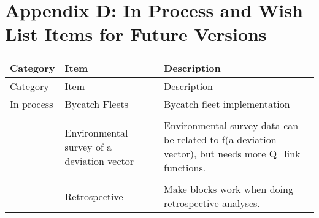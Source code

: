 \section{Appendix D: In Process and Wish List Items for Future Versions}

\begin{center}
	\begin{longtable}{p{2cm} p{3cm} p{10cm}}
		Category & Item & Description\\
		\hline
		\endfirsthead
				
		Category & Item & Description\\
		\hline
		\endhead
				
		\hline
		\endfoot
				
		\endlastfoot
		
		In process & 
			Bycatch Fleets & Bycatch fleet implementation \\
			\\
		  &	Environmental survey of a deviation vector & Environmental survey data can be related to f(a deviation vector), but needs more Q\_link functions.\\
		  \\
		  & Retrospective & Make blocks work when doing retrospective analyses. \\
		

\end{longtable}
\end{center}
